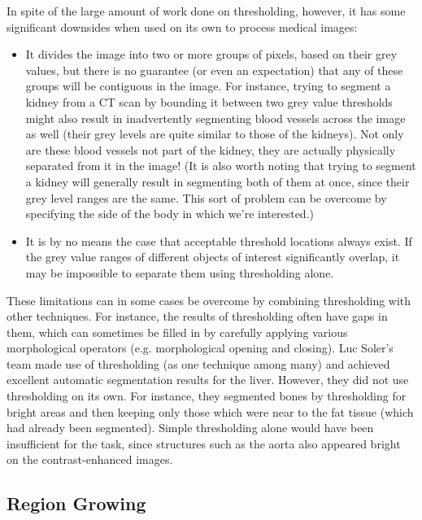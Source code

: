 \noindent In spite of the large amount of work done on thresholding, however, it has some significant downsides when used on its own to process medical images:

\begin{itemize}

\item It divides the image into two or more groups of pixels, based on their grey values, but there is no guarantee (or even an expectation) that any of these groups will be contiguous in the image. For instance, trying to segment a kidney from a CT scan by bounding it between two grey value thresholds might also result in inadvertently segmenting blood vessels across the image as well (their grey levels are quite similar to those of the kidneys). Not only are these blood vessels not part of the kidney, they are actually physically separated from it in the image! (It is also worth noting that trying to segment a kidney will generally result in segmenting both of them at once, since their grey level ranges are the same. This sort of problem can be overcome by specifying the side of the body in which we're interested.)

\item It is by no means the case that acceptable threshold locations always exist. If the grey value ranges of different objects of interest significantly overlap, it may be impossible to separate them using thresholding alone.

\end{itemize}

\newpage

\noindent These limitations can in some cases be overcome by combining thresholding with other techniques. For instance, the results of thresholding often have gaps in them, which can sometimes be filled in by carefully applying various morphological operators (e.g. morphological opening and closing). Luc Soler's team \cite{soler01} made use of thresholding (as one technique among many) and achieved excellent automatic segmentation results for the liver. However, they did not use thresholding on its own. For instance, they segmented bones by thresholding for bright areas and then keeping only those which were near to the fat tissue (which had already been segmented). Simple thresholding alone would have been insufficient for the task, since structures such as the aorta also appeared bright on the contrast-enhanced images.

\subsection{Region Growing}

